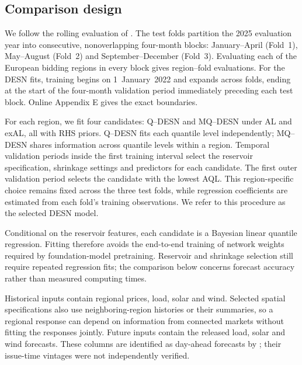 \documentclass[12pt,letterpaper]{article}
\numberwithin{equation}{section}
\begin{document}
\subsection{Comparison design}

We follow the rolling evaluation of \citet{YuEtAl2026PriceFM}. The
\PricefmFullFolds{} test folds partition the 2025 evaluation year into
consecutive, nonoverlapping four-month blocks: January--April (Fold~1),
May--August (Fold~2) and September--December (Fold~3). Evaluating each of
the \PricefmFullRegions{} European bidding regions in every block gives
\PricefmFullRegionFolds{} region--fold evaluations. For the DESN fits,
training begins on 1~January~2022 and expands across folds, ending at the
start of the four-month validation period immediately preceding each test
block. Online Appendix E gives the exact boundaries.

For each region, we fit four candidates:
Q--DESN and MQ--DESN under AL and exAL, all with RHS priors. Q--DESN fits
each quantile level independently; MQ--DESN shares information across
quantile levels within a region. Temporal validation periods inside the
first training interval select the reservoir specification, shrinkage
settings and predictors for each candidate. The first outer validation
period selects the candidate with the lowest AQL. This region-specific
choice remains fixed across the three test folds, while regression
coefficients are estimated from each fold's training observations.
We refer to this procedure as the selected DESN model.

Conditional on the reservoir features, each candidate is a Bayesian linear
quantile regression. Fitting therefore avoids the end-to-end training of
network weights required by foundation-model pretraining. Reservoir and
shrinkage selection still require repeated regression fits; the comparison
below concerns forecast accuracy rather than measured computing times.

Historical inputs contain regional prices, load, solar and wind. Selected
spatial specifications also use neighboring-region histories or their
summaries, so a regional response can depend on information from connected
markets without fitting the responses jointly. Future inputs contain the
released load, solar and wind forecasts. These columns are identified as
day-ahead forecasts by \citet{YuEtAl2026PriceFM}; their issue-time vintages
were not independently verified.
\end{document}
